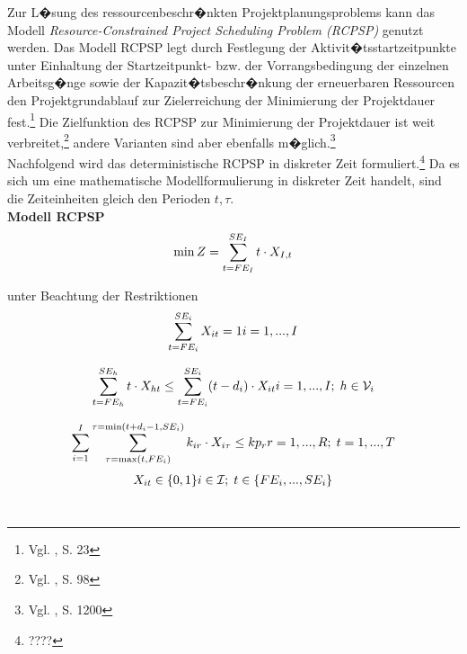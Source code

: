 \documentclass[a4paper,12pt,parskip,bibtotoc,liststotoc]{article}
\begin{document}
Zur L�sung des ressourcenbeschr�nkten Projektplanungsproblems kann das Modell \textit{Resource-Constrained Project Scheduling Problem (RCPSP)} genutzt werden. Das Modell RCPSP legt durch Festlegung der Aktivit�tsstartzeitpunkte unter Einhaltung der Startzeitpunkt- bzw. der Vorrangsbedingung der einzelnen Arbeitsg�nge sowie der Kapazit�tsbeschr�nkung der erneuerbaren Ressourcen den Projektgrundablauf zur Zielerreichung der Minimierung der Projektdauer fest.\footnote{Vgl. \cite{demeulemeester2011robust}, S. 23} Die Zielfunktion des RCPSP zur Minimierung der Projektdauer ist weit verbreitet,\footnote{Vgl. \cite{drexl1997neuere}, S. 98} andere Varianten sind aber ebenfalls m�glich.\footnote{Vgl. \cite{talbot1982resource}, S. 1200}\\

Nachfolgend wird das deterministische RCPSP in diskreter Zeit formuliert.\footnote{????} Da es sich um eine mathematische Modellformulierung in diskreter Zeit handelt, sind die Zeiteinheiten gleich den Perioden $t, \tau$.\\
\textbf{Modell RCPSP}
\begin{eqnarray} \label{Ziel}
\min Z = \sum_{t=FE_{I}}^{SE_{I}}t \cdot X_{I,t}\hfill  
\end{eqnarray}

unter Beachtung der Restriktionen
\begin{multline} \label{N1}
\sum_{t=FE_{i}}^{SE_{i}} X_{it} = 1
\hfill   i = 1,...,I
\end{multline}\vspace{-3.0ex}

\begin{multline} \label{N2}
\sum_{t=FE_{h}}^{SE_{h}}t \cdot X_{ht} \leq \sum_{t=FE_{i}}^{SE_{i}}(t - d_{i}) \cdot X_{it}
\hfill   i =1,...,I;\; h \in \mathcal{V}_{i}
\end{multline}\vspace{-3.0ex}

\begin{multline} \label{N3}
\sum_{i=1}^{I}\sum_{\tau=\max(t,FE_{i})}^{\tau=\min(t+d_i-1,SE_i)}k_ {ir} \cdot X_{i\tau} \leq kp_{r}
\hfill   r =1,...,R;\; t=1,...,T
\end{multline}\vspace{-3.0ex}
\begin{multline} \label{N4}
X_{it} \in \{0,1\}
\hfill   i \in \mathcal{I};\; t \in \{FE_{i},...,SE_{i}\}\end{multline}\vspace{-6.0ex}\\
\end{document}
